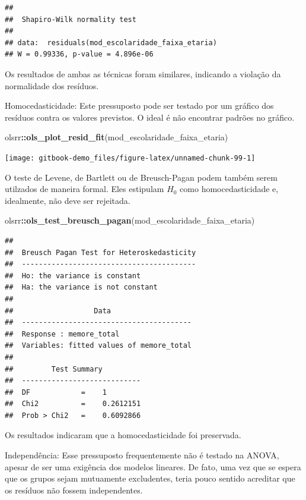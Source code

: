\documentclass[
]{book}
\newenvironment{Shaded}{\begin{snugshade}}{\end{snugshade}}
\newcommand{\KeywordTok}[1]{\textcolor[rgb]{0.13,0.29,0.53}{\textbf{#1}}}
\newcommand{\NormalTok}[1]{#1}
\newcommand{\OperatorTok}[1]{\textcolor[rgb]{0.81,0.36,0.00}{\textbf{#1}}}
\begin{document}
\begin{verbatim}
## 
##  Shapiro-Wilk normality test
## 
## data:  residuals(mod_escolaridade_faixa_etaria)
## W = 0.99336, p-value = 4.896e-06
\end{verbatim}

Os resultados de ambas as técnicas foram similares, indicando a violação da normalidade dos resíduos.

Homocedasticidade: Este pressuposto pode ser testado por um gráfico dos resíduos contra os valores previstos. O ideal é não encontrar padrões no gráfico.

\begin{Shaded}
\begin{Highlighting}[]
\NormalTok{olsrr}\OperatorTok{::}\KeywordTok{ols_plot_resid_fit}\NormalTok{(mod_escolaridade_faixa_etaria)}
\end{Highlighting}
\end{Shaded}

\begin{center}\texttt{[image: gitbook-demo\_files/figure-latex/unnamed-chunk-99-1]} \end{center}

O teste de Levene, de Bartlett ou de Breusch-Pagan podem também serem utilzados de maneira formal. Eles estipulam \(H_0\) como homocedasticidade e, idealmente, não deve ser rejeitada.

\begin{Shaded}
\begin{Highlighting}[]
\NormalTok{olsrr}\OperatorTok{::}\KeywordTok{ols_test_breusch_pagan}\NormalTok{(mod_escolaridade_faixa_etaria)}
\end{Highlighting}
\end{Shaded}

\begin{verbatim}
## 
##  Breusch Pagan Test for Heteroskedasticity
##  -----------------------------------------
##  Ho: the variance is constant            
##  Ha: the variance is not constant        
## 
##                   Data                   
##  ----------------------------------------
##  Response : memore_total 
##  Variables: fitted values of memore_total 
## 
##         Test Summary         
##  ----------------------------
##  DF            =    1 
##  Chi2          =    0.2612151 
##  Prob > Chi2   =    0.6092866
\end{verbatim}

Os resultados indicaram que a homocedasticidade foi preservada.

Independência: Esse pressuposto frequentemente não é testado na ANOVA, apesar de ser uma exigência dos modelos lineares. De fato, uma vez que se espera que os grupos sejam mutuamente excludentes, teria pouco sentido acreditar que os resíduos não fossem independentes.
\end{document}
